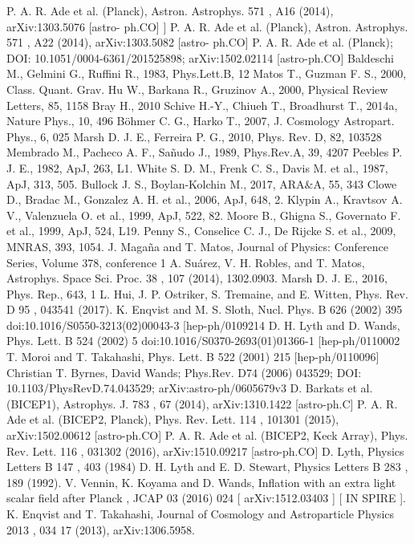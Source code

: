 \documentclass[amssymb,twocolumn,prd,nofootinbib,showpacs]{revtex4-1}
\begin{document}
\begin{thebibliography}{9}
  P. A. R. Ade
et al.
(Planck), Astron. Astrophys.
571
, A16 (2014), arXiv:1303.5076 [astro-
ph.CO]
 ]  P. A. R. Ade
et al.
(Planck), Astron. Astrophys.
571
, A22 (2014), arXiv:1303.5082 [astro-
ph.CO]
 P. A. R. Ade et al. (Planck); DOI: 	10.1051/0004-6361/201525898;  	arXiv:1502.02114 [astro-ph.CO]
 Baldeschi M., Gelmini G., Ruffini R., 1983, Phys.Lett.B, 12
 Matos T., Guzman F. S., 2000, Class. Quant. Grav. 
 Hu W., Barkana R., Gruzinov A., 2000, Physical Review Letters, 85, 1158
Bray H., 2010
Schive H.-Y., Chiueh T., Broadhurst T., 2014a, Nature Phys., 10, 496
B\"ohmer C. G., Harko T., 2007, J. Cosmology Astropart. Phys., 6, 025
Marsh D. J. E., Ferreira P. G., 2010, Phys. Rev. D, 82, 103528
 Membrado M., Pacheco A. F., Sa\~nudo J., 1989, Phys.Rev.A, 39, 4207
Peebles P. J. E., 1982, ApJ, 263, L1.
White S. D. M., Frenk C. S., Davis M. et al., 1987, ApJ, 313, 505.
Bullock J. S., Boylan-Kolchin M., 2017, ARA$\&$A, 55, 343
Clowe D., Bradac M., Gonzalez A. H. et al., 2006, ApJ, 648, 2.
Klypin A., Kravtsov A. V., Valenzuela O. et al., 1999, ApJ, 522, 82.
Moore B., Ghigna S., Governato F. et al., 1999, ApJ, 524, L19.
Penny S., Conselice C. J., De Rijcke S. et al., 2009, MNRAS, 393, 1054.
 J. Maga\~na and T. Matos,  Journal of Physics: Conference Series, Volume 378, conference 1
  A. Su\'arez, V. H. Robles, and T. Matos, Astrophys. Space
Sci. Proc.
38
, 107 (2014), 1302.0903.
 Marsh D. J. E., 2016, Phys. Rep., 643, 1
  L. Hui, J. P. Ostriker, S. Tremaine, and E. Witten, Phys. Rev. D
95
, 043541 (2017).
K. Enqvist and M. S. Sloth, Nucl. Phys. B
626
(2002) 395 doi:10.1016/S0550-3213(02)00043-3
[hep-ph/0109214
 D. H. Lyth and D. Wands, Phys. Lett. B
524
(2002) 5 doi:10.1016/S0370-2693(01)01366-1
[hep-ph/0110002
 T. Moroi and T. Takahashi, Phys. Lett. B
522
(2001) 215 [hep-ph/0110096]
 Christian T. Byrnes, David Wands;  Phys.Rev. D74 (2006) 043529; DOI:  	10.1103/PhysRevD.74.043529;  arXiv:astro-ph/0605679v3
  D. Barkats
et al.
(BICEP1), Astrophys. J.
783
, 67 (2014), arXiv:1310.1422 [astro-ph.C]
 P. A. R. Ade
et al.
(BICEP2, Planck), Phys. Rev. Lett.
114
, 101301 (2015), arXiv:1502.00612
[astro-ph.CO]
  P.  A.  R.  Ade
et al.
(BICEP2,   Keck  Array),  Phys.  Rev.  Lett.
116
,  031302  (2016),
arXiv:1510.09217 [astro-ph.CO]
  D. Lyth, Physics Letters B
147
, 403  (1984)
  D. H. Lyth and E. D. Stewart, Physics Letters B
283
, 189  (1992).
%
%
%
 V. Vennin, K. Koyama and D. Wands,
Inflation with an extra light scalar field after Planck
,
JCAP
03
(2016) 024 [
arXiv:1512.03403
] [
IN
SPIRE
].
K.  Enqvist  and  T.  Takahashi,  Journal  of  Cosmology  and  Astroparticle  Physics
2013
,  034
17
(2013),  arXiv:1306.5958.


\end{thebibliography}
\end{document}
